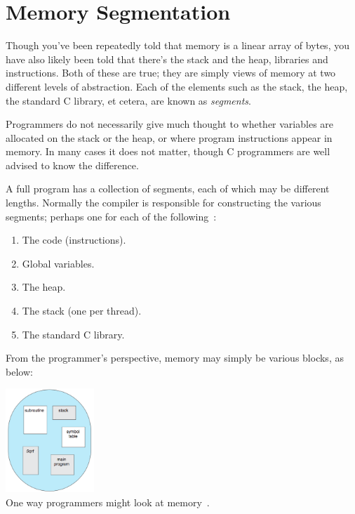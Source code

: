 




\section*{Memory Segmentation}

Though you've been repeatedly told that memory is a linear array of bytes, you have also likely been told that there's the stack and the heap, libraries and instructions. Both of these are true; they are simply views of memory at two different levels of abstraction. Each of the elements such as the stack, the heap, the standard C library, et cetera, are known as \textit{segments}.

Programmers do not necessarily give much thought to whether variables are allocated on the stack or the heap, or where program instructions appear in memory. In many cases it does not matter, though C programmers are well advised to know the difference.

A full program has a collection of segments, each of which may be different lengths. Normally the compiler is responsible for constructing the various segments; perhaps one for each of the following~\cite{osc}:

\begin{enumerate}
	\item The code (instructions).
	\item Global variables.
	\item The heap.
	\item The stack (one per thread).
	\item The standard C library.
\end{enumerate}

From the programmer's perspective, memory may simply be various blocks, as below:

\begin{center}
\includegraphics[width=0.25\textwidth]{images/segments.png}\\
One way programmers might look at memory~\cite{osc}.
\end{center}

